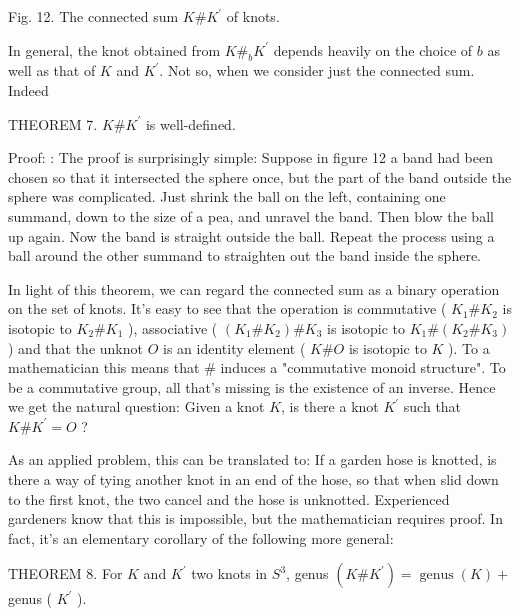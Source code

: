 \documentclass[10pt, letterpaper]{article}
\begin{document}
Fig. 12. The connected sum $K \# K^{\prime}$ of knots.

In general, the knot obtained from $K \#_{b} K^{\prime}$ depends heavily on the choice of $b$ as well as that of $K$ and $K^{\prime}$. Not so, when we consider just the connected sum. Indeed

THEOREM 7. $K \# K^{\prime}$ is well-defined.

Proof: : The proof is surprisingly simple: Suppose in figure 12 a band had been chosen so that it intersected the sphere once, but the part of the band outside the sphere was complicated. Just shrink the ball on the left, containing one summand, down to the size of a pea, and unravel the band. Then blow the ball up again. Now the band is straight outside the ball. Repeat the process using a ball around the other summand to straighten out the band inside the sphere.

In light of this theorem, we can regard the connected sum as a binary operation on the set of knots. It's easy to see that the operation is commutative ( $K_{1} \# K_{2}$ is isotopic to $K_{2} \# K_{1}$ ), associative ( $\left(K_{1} \# K_{2}\right) \# K_{3}$ is isotopic to $K_{1} \#\left(K_{2} \# K_{3}\right)$ ) and that the unknot $O$ is an identity element ( $K \# O$ is isotopic to $K$ ). To a mathematician this means that \# induces a "commutative monoid structure". To be a commutative group, all that's missing is the existence of an inverse. Hence we get the natural question: Given a knot $K$, is there a knot $K^{\prime}$ such that $K \# K^{\prime}=O$ ?

As an applied problem, this can be translated to: If a garden hose is knotted, is there a way of tying another knot in an end of the hose, so that when slid down to the first knot, the two cancel and the hose is unknotted. Experienced gardeners know that this is impossible, but the mathematician requires proof. In fact, it's an elementary corollary of the following more general:

THEOREM 8. For $K$ and $K^{\prime}$ two knots in $S^{3}$, genus $\left(K \# K^{\prime}\right)=\operatorname{genus}(K)+$ genus ( $K^{\prime}$ ).
\end{document}
